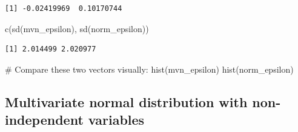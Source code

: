 \documentclass[
  letterpaper,
  DIV=11,
  numbers=noendperiod]{scrreprt}
\newenvironment{Shaded}{\begin{snugshade}}{\end{snugshade}}
\newcommand{\CommentTok}[1]{\textcolor[rgb]{0.37,0.37,0.37}{#1}}
\newcommand{\FunctionTok}[1]{\textcolor[rgb]{0.28,0.35,0.67}{#1}}
\newcommand{\NormalTok}[1]{\textcolor[rgb]{0.00,0.23,0.31}{#1}}
\begin{document}
\begin{verbatim}
[1] -0.02419969  0.10170744
\end{verbatim}

\begin{Shaded}
\begin{Highlighting}[]
\FunctionTok{c}\NormalTok{(}\FunctionTok{sd}\NormalTok{(mvn\_epsilon), }\FunctionTok{sd}\NormalTok{(norm\_epsilon))}
\end{Highlighting}
\end{Shaded}

\begin{verbatim}
[1] 2.014499 2.020977
\end{verbatim}

\begin{Shaded}
\begin{Highlighting}[]
\CommentTok{\# Compare these two vectors visually:}
\FunctionTok{hist}\NormalTok{(mvn\_epsilon)}
\FunctionTok{hist}\NormalTok{(norm\_epsilon)}
\end{Highlighting}
\end{Shaded}

\begin{figure}

\begin{minipage}[t]{0.50\linewidth}

{\centering 


}

\end{minipage}%
%
\begin{minipage}[t]{0.50\linewidth}

{\centering 


}

\end{minipage}%

\end{figure}

\hypertarget{multivariate-normal-distribution-with-non-independent-variables}{%
\subsection{Multivariate normal distribution with non-independent
variables}\label{multivariate-normal-distribution-with-non-independent-variables}}
\end{document}

